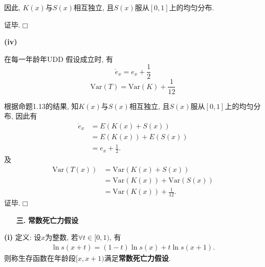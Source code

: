 \documentclass[a4paper,10pt]{ctexbook}
\newcommand{\hei}{\CJKfamily{hei}}      %
\def\qed{\hfill$\Box$\medskip}
\begin{document}
因此, $K(x)$与$S(x)$相互独立, 且$S(x)$服从$[0,1]$上的均匀分布.

证毕.\qed

{\rm\bf(iv)}  \begin{proposition}在每一年龄年UDD 假设成立时, 有
    $$\mathring{e}_{x}=e_{x}+\frac{1}{2}$$
    $$\text{Var}(T)=\text{Var}(K)+\frac{1}{12}$$
\end{proposition}
\proof
根据命题1.13的结果, 知$K(x)$与$S(x)$相互独立, 且$S(x)$服从$[0,1]$上的均匀分布, 因此有
\begin{align*}
    \mathring{e}_{x} & =E(K(x)+S(x))        \\
                     & = E(K(x))+E(S(x))    \\
                     & = e_{x}+\frac{1}{2}.
\end{align*}
及\begin{align*}
    \text{Var}(T(x)) & =\text{Var}(K(x)+S(x))             \\
                     & =\text{Var}(K(x))+\text{Var}(S(x)) \\
                     & =\text{Var}(K(x))+\frac{1}{12}.
\end{align*}
证毕.\qed

\begin{itemize}
    \item[{\bf\hei 三.}]{\bf\hei 常数死亡力假设}
\end{itemize}

{\rm\bf(i)}  定义: 设$x$为整数, 若$\forall t\in [0,1)$, 有
\begin{align}\label{tul}
    \ln s(x+t)=(1-t)\ln s(x)+t\ln s(x+1).
\end{align}
则称生存函数在年龄段$[x,x+1)$满足\textbf{常数死亡力假设}.
\end{document}
